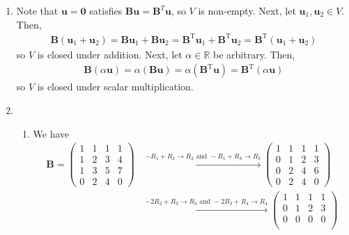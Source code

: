 \documentclass[12pt]{article}
\begin{document}
\begin{enumerate}[label=\textbf{(\alph*)}]
    \itemsep 0em
    \item Note that $\mathbf{u}=\mathbf{0}$ satisfies $\mathbf{Bu} = \mathbf{B}^T \mathbf{u}$, so $V$ is non-empty.
    \newline
    \newline Next, let $\mathbf{u}_1,\mathbf{u}_2\in V$. Then, \begin{align*}
        \mathbf{B}\left(\mathbf{u}_1+\mathbf{u}_2\right)=\mathbf{Bu}_1+\mathbf{Bu}_2=\mathbf{B}^\text{T}\mathbf{u}_1+\mathbf{B}^\text{T}\mathbf{u}_2=\mathbf{B}^\text{T}\left(\mathbf{u}_1+\mathbf{u}_2\right)
        \end{align*}
        so $V$ is closed under addition.
        \newline
        \newline Next, let $\alpha\in\mathbb{R}$ be arbitrary. Then, \begin{align*}
            \mathbf{B}\left(\alpha \mathbf{u}\right)=\alpha\left(\mathbf{Bu}\right)=\alpha\left(\mathbf{B}^\text{T}\mathbf{u}\right)=\mathbf{B}^\text{T}\left(\alpha\mathbf{u}\right)
        \end{align*}
        so $V$ is closed under scalar multiplication.
        \item \begin{enumerate}[label=\textbf{(\roman*)}]
            \itemsep 0em
            \item We have \begin{align*}
                \mathbf{B}=\begin{pmatrix}
    1 & 1 & 1 & 1 \\
    1 & 2 & 3 & 4 \\
    1 & 3 & 5 & 7 \\
    0 & 2 & 4 & 0
\end{pmatrix} &\xrightarrow{-R_1+R_2\rightarrow R_2\text{ and }-R_1+R_3\rightarrow R_3}\begin{pmatrix}
    1 & 1 & 1 & 1 \\
    0 & 1 & 2 & 3 \\
    0 & 2 & 4 & 6 \\
    0 & 2 & 4 & 0
\end{pmatrix}\\
&\xrightarrow{-2R_2+R_3\rightarrow R_3\text{ and }-2R_2+R_4\rightarrow R_4} \begin{pmatrix}
    1 & 1 & 1 & 1 \\
    0 & 1 & 2 & 3 \\
    0 & 0 & 0 & 0 \\

\end{pmatrix}
\end{align*}
\end{enumerate}
\end{enumerate}
\end{document}
